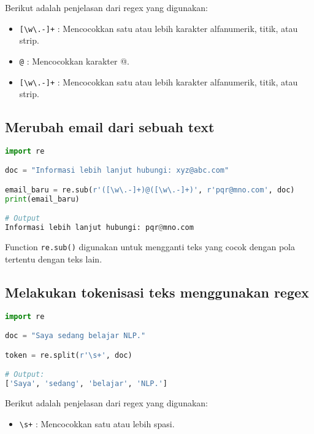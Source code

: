 \documentclass{article}
\begin{document}
    \begin{flushleft}
        Berikut adalah penjelasan dari regex yang digunakan:
        \begin{itemize}
            \item \texttt{[\textbackslash w\textbackslash .-]+} : Mencocokkan satu atau lebih karakter alfanumerik, titik, atau strip.
            \item \texttt{@} : Mencocokkan karakter @.
            \item \texttt{[\textbackslash w\textbackslash .-]+} : Mencocokkan satu atau lebih karakter alfanumerik, titik, atau strip.
        \end{itemize}
    \end{flushleft}

    \subsection*{Merubah email dari sebuah text}

    \begin{lstlisting}[language=python, style=pythonstyle]
import re

doc = "Informasi lebih lanjut hubungi: xyz@abc.com"

email_baru = re.sub(r'([\w\.-]+)@([\w\.-]+)', r'pqr@mno.com', doc)
print(email_baru)

# Output
Informasi lebih lanjut hubungi: pqr@mno.com
    \end{lstlisting}

    \begin{flushleft}
        Function \texttt{re.sub()} digunakan untuk mengganti teks yang cocok dengan pola tertentu dengan teks lain.
    \end{flushleft}

    \subsection*{Melakukan tokenisasi teks menggunakan regex}

    \begin{lstlisting}[language=python, style=pythonstyle]
import re

doc = "Saya sedang belajar NLP."

token = re.split(r'\s+', doc)

# Output:
['Saya', 'sedang', 'belajar', 'NLP.']
    \end{lstlisting}

    \begin{flushleft}
        Berikut adalah penjelasan dari regex yang digunakan:
        \begin{itemize}
            \item \texttt{\textbackslash s+} \@: Mencocokkan satu atau lebih spasi.
        \end{itemize}
    \end{flushleft}
\end{document}
